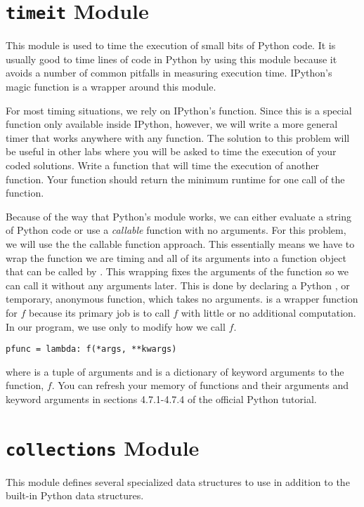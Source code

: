 \section*{\texttt{timeit} Module}
This module is used to time the execution of small bits of Python code.
It is usually good to time lines of code in Python by using this module because it avoids a number of common pitfalls in measuring execution time.
IPython's  magic function is a wrapper around this module.

\begin{problem}
For most timing situations, we rely on IPython's  function.
Since this is a special function only available inside IPython, however, we will write a more general timer that works anywhere with any function.
The solution to this problem will be useful in other labs where you will be asked to time the execution of your coded solutions.
Write a function that will time the execution of another function.
Your function should return the minimum runtime for one call of the function.

Because of the way that Python's  module works, we can either evaluate a string of Python code or use a \emph{callable} function with no arguments.
For this problem, we will use the the callable function approach.
This essentially means we have to wrap the function we are timing and all of its arguments into a function object that can be called by .
This wrapping fixes the arguments of the function so we can call it without any arguments later.
This is done by declaring a Python , or temporary, anonymous  function, which takes no arguments.   is a wrapper function for $f$ because its primary job is to call $f$ with little or no additional computation.
In our program, we use  only to modify how we call $f$.
\begin{lstlisting}
pfunc = lambda: f(*args, **kwargs)
\end{lstlisting}
where  is a tuple of arguments and  is a dictionary of keyword arguments to the function, $f$.
You can refresh your memory of functions and their arguments and keyword arguments in sections 4.7.1-4.7.4 of the official Python tutorial.
\end{problem}

\section*{\texttt{collections} Module}
This module defines several specialized data structures to use in addition to the built-in Python data structures.


